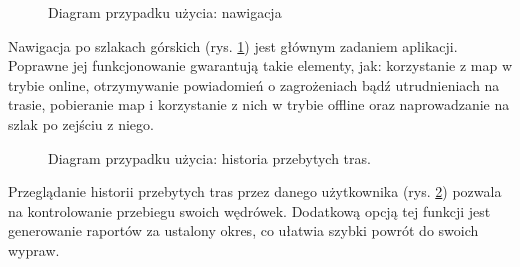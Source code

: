     \setlength{\fboxrule}{0.5pt}
    \begin{figure}[H]
        \centering
        \caption{Diagram przypadku użycia: nawigacja}
        \label{ucd:nawigacja}
    \end{figure}
    Nawigacja po szlakach górskich (rys. \ref{ucd:nawigacja}) jest głównym zadaniem aplikacji. Poprawne jej funkcjonowanie gwarantują takie elementy, jak: korzystanie z map w trybie online, otrzymywanie powiadomień o zagrożeniach bądź utrudnieniach na trasie, pobieranie map i korzystanie z nich w trybie offline oraz naprowadzanie na szlak po zejściu z niego.

    \setlength{\fboxrule}{0.5pt}
    \begin{figure}[H]
        \centering
        \caption{Diagram przypadku użycia: historia przebytych tras.}
        \label{ucd:historia}
    \end{figure}
    Przeglądanie historii przebytych tras przez danego użytkownika (rys. \ref{ucd:historia}) pozwala na kontrolowanie przebiegu swoich wędrówek. Dodatkową opcją tej funkcji jest generowanie raportów za ustalony okres, co ułatwia szybki powrót do swoich wypraw.

